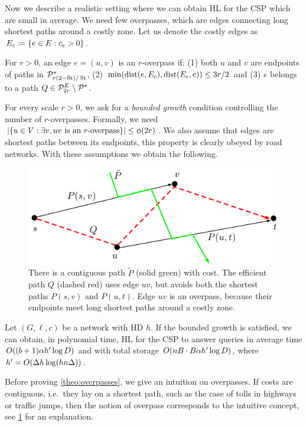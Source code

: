 Now we describe a realistic setting where we can obtain HL for the CSP which are small in average.
We need few overpasses, which are edges connecting long shortest paths around a costly zone.
Let us denote the costly edges as $E_c\coloneqq\{e\in E:c_e>0\}$.

\begin{definition}[Overpass]
For $r>0$, an edge $e=(u,v)$ is an $r$-overpass if: (1) both $u$ and $v$ are endpoints of paths in $\mathcal{P}^*_{r(2-\operatorname{St})/\operatorname{St}}$, (2) $\min(\mbox{dist}(e,E_c),\mbox{dist}(E_c,e))\leq 3r/2$ and (3) $e$ belongs to a path $Q\in\mathcal{P}^E_{2r}\setminus\mathcal{P}^*$.
\end{definition} 

For every scale $r>0$, we ask for a \emph{bounded growth} condition controlling the number of $r$-overpasses.
Formally, we need $\lvert\{u\in V: \exists v, uv \text{ is an $r$-overpass}\}\rvert\leq \phi(2r)$.
We also assume that edges are shortest paths between its endpoints, this property is clearly obeyed by road networks.
With these assumptions we obtain the following.

\begin{figure}
\includegraphics[scale=0.7]{TexImg/overpass.pdf}
\caption{There is a contiguous path $\tilde P$ (solid green) with cost. 
The efficient path $Q$ (dashed red) uses edge $uv$, but avoids both the shortest paths $P(s,v)$ and $P(u,t)$.
Edge $uv$ is an overpass, because their endpoints meet long shortest paths around a costly zone.} 
\label{fig:overpass}
\end{figure}

\begin{theorem}\label{theo:overpasses}
Let $(G,\ell,c)$ be a network with HD $h$.
If the bounded growth is satisfied, we can obtain, in polynomial time, HL for the CSP to answer queries in average time $O((b+1)\alpha h'\log D)$ and with total storage $O(nB\cdot B\alpha h'\log D)$, where $h'=O(\Delta h\log(hn\Delta))$.
\end{theorem}

Before proving \cref{theo:overpasses}, we give an intuition on overpasses.
If costs are contiguous, i.e.\ they lay on a shortest path, such as the case of tolls in highways or traffic jumps, then the notion of overpass corresponds to the intuitive concept, see \cref{fig:overpass} for an explanation.


